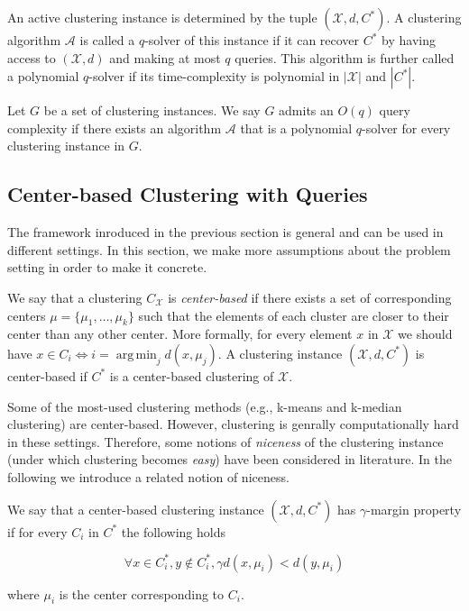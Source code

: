 \documentclass[orivec]{llncs}
\newcommand{\mc}{\mathcal}
\DeclareMathOperator*{\argmin}{arg\,min}
\begin{document}
An active clustering instance is determined by the tuple $(\mc X, d, C^*)$. A clustering algorithm $\mc A$ is called a $q$-solver of this instance if it can recover $C^*$ by having access to $(\mc X, d)$ and making at most $q$ queries. This algorithm is further called a polynomial $q$-solver if its time-complexity is polynomial in $|\mc X|$ and $|C^*|$.

\begin{definition}
\label{definition:QueryComplexity}
Let $G$ be a set of clustering instances. We say $G$ admits an $O(q)$ query complexity if there exists an algorithm $\mc A$ that is a polynomial $q$-solver for every clustering instance in $G$.
\end{definition}

\subsection{Center-based Clustering with Queries}

The framework inroduced in the previous section is general and can be used in different settings. In this section, we make more assumptions about the problem setting in order to make it concrete.

We say that a clustering $C_{\mc X}$ is \emph{center-based} if there exists a set of corresponding centers $\mc \mu = \{\mu_1, \ldots, \mu_k\}$ such that the elements of each cluster are closer to their center than any other center. More formally, for every element $x$ in $\mc X$ we should have $x\in C_i \Leftrightarrow i=\argmin_j d(x,\mu_j)$. A clustering instance $(\mc X, d, C^*)$ is center-based if $C^*$ is a center-based clustering of $\mc X$.

Some of the most-used clustering methods (e.g., k-means and k-median clustering) are center-based. However, clustering is genrally computationally hard in these settings. Therefore, some notions of \emph{niceness} of the clustering instance (under which clustering becomes \emph{easy}) have been considered in literature. In the following we introduce a related notion of niceness.

\begin{definition}
\label{defn:alphacp}
We say that a center-based clustering instance $(\mc X, d, C^*)$ has $\gamma$-margin property if for every $C_i$ in $C^*$ the following holds

$$\forall x\in C^*_i, y \notin C^*_i, \gamma d(x, \mu_i) < d(y, \mu_i)$$

where $\mu_i$ is the center corresponding to $C_i$.

\end{definition}
\end{document}
